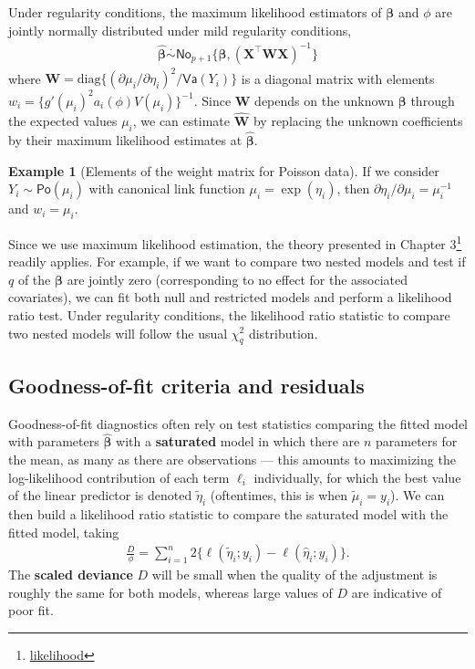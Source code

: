 \documentclass[
  11pt,
  letterpaper,
]{book}
\renewcommand{\href}[2]{#2\footnote{\url{#1}}}
\theoremstyle{definition}
\theoremstyle{definition}
\newtheorem{example}{Example}[chapter]
\theoremstyle{definition}
\theoremstyle{remark}
\begin{document}
Under regularity conditions, the maximum likelihood estimators of \(\boldsymbol{\beta}\) and \(\phi\) are jointly normally distributed under mild regularity conditions, \begin{align*}\widehat{\boldsymbol{\beta}} \stackrel{\cdot}{\sim}\mathsf{No}_{p+1}\{\boldsymbol{\beta}, (\mathbf{X}^\top\mathbf{W}\mathbf{X})^{-1}\}
\end{align*}
where \(\mathbf{W} = \mathrm{diag}\{(\partial \mu_i/\partial \eta_i)^2/\mathsf{Va}(Y_i)\}\) is a diagonal matrix with elements \(w_i=\{g'(\mu_i)^2a_i(\phi)V(\mu_i)\}^{-1}\).
Since \(\mathbf{W}\) depends on the unknown \(\boldsymbol{\beta}\) through the expected values \(\mu_i\), we can estimate \(\widehat{\mathbf{W}}\) by replacing the unknown coefficients by their maximum likelihood estimates at \(\widehat{\boldsymbol{\beta}}\).

\begin{example}[Elements of the weight matrix for Poisson data]
\protect\hypertarget{exm:weightpois}{}{\label{exm:weightpois} {} }If we consider \(Y_i \sim \mathsf{Po}(\mu_i)\) with canonical link function \(\mu_i = \exp(\eta_i)\), then \(\partial \eta_i / \partial \mu_i = \mu_i^{-1}\) and \(w_i=\mu_i\).
\end{example}

Since we use maximum likelihood estimation, the theory presented in \href{likelihood}{Chapter 3} readily applies. For example, if we want to compare two nested models and test if \(q\) of the \(\boldsymbol{\beta}\) are jointly zero (corresponding to no effect for the associated covariates), we can fit both null and restricted models and perform a likelihood ratio test. Under regularity conditions, the likelihood ratio statistic to compare two nested models will follow the usual \(\chi^2_q\) distribution.

\hypertarget{goodness-of-fit-criteria-and-residuals}{%
\subsection{Goodness-of-fit criteria and residuals}\label{goodness-of-fit-criteria-and-residuals}}

Goodness-of-fit diagnostics often rely on test statistics comparing the fitted model with parameters \(\widehat{\boldsymbol{\beta}}\) with a \textbf{saturated} model in which there are \(n\) parameters for the mean, as many as there are observations --- this amounts to maximizing the log-likelihood contribution of each term \(\ell_i\) individually, for which the best value of the linear predictor is denoted \(\widetilde{\eta}_i\) (oftentimes, this is when \(\widetilde{\mu}_i=y_i\)). We can then build a likelihood ratio statistic to compare the saturated model with the fitted model, taking
\begin{align*}
\frac{D}{\phi}= \sum_{i=1}^n 2\{\ell(\widetilde{\eta}_i; y_i) - \ell(\widehat{\eta}_i; y_i)\}.
\end{align*}
The \textbf{scaled deviance} \(D\) will be small when the quality of the adjustment is roughly the same for both models, whereas large values of \(D\) are indicative of poor fit.
\end{document}

